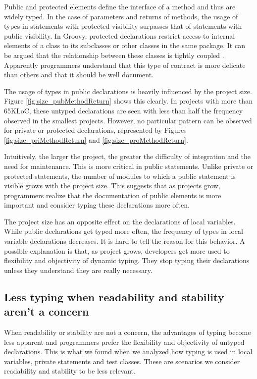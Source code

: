 \documentclass[preprint]{sigplanconf}
\begin{document}
Public and protected elements define the interface of a method and thus are widely typed.
In the case of parameters and returns of methods, the usage of types in statements with protected visibility  surpasses that of statements with public visibility.
In Groovy, protected declarations restrict access to internal elements of a class to its subclasses or other classes in the same package.
It can be argued that the relationship between these classes is tightly coupled \cite{Chidamber94}.
Apparently programmers understand that this type of contract is more delicate than others and that it should be well document.

The usage of types in public declarations is heavily influenced by the project size.
Figure \ref{fig:size_pubMethodReturn} shows this clearly.
In projects with more than 65KLoC, these untyped declarations are seen with less than half the frequency observed in the smallest projects.
However, no particular pattern can be observed for private or protected declarations, represented by Figures \ref{fig:size_priMethodReturn} and \ref{fig:size_proMethodReturn}.

Intuitively, the larger the project, the greater the difficulty of integration and the need for maintenance.
This is more critical in public statements.
Unlike private or protected statements, the number of modules to which a public statement is visible grows with the project size.
This suggests that as projects grow, programmers realize that the documentation of public elements is more important and consider typing these declarations more often.

The project size has an opposite effect on the declarations of local variables.
While public declarations get typed more often, the frequency of types in local variable declarations decreases.
It is hard to tell the reason for this behavior.
A possible explanation is that, as project grows, developers get more used to flexibility and objectivity of dynamic typing.
They stop typing their declarations unless they understand they are really necessary.

\subsection{Less typing when readability and stability aren't a concern\label{discussion-q2}}
When readability or stability are not a concern, the advantages of typing become less apparent and  programmers prefer the flexibility and objectivity of untyped declarations.
This is what we found when we analyzed how typing is used in local variables, private statements and test classes.
These are scenarios we consider readability and stability to be less relevant.
\end{document}
